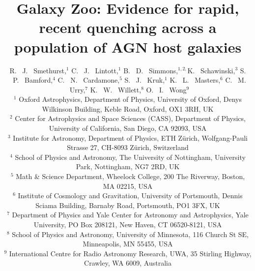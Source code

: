 \documentclass[useAMS,usenatbib]{mn2e}
\begin{document}
\title[Quenching Histories of AGN Host Galaxies]{Galaxy Zoo: Evidence for rapid, recent quenching across a population of AGN host galaxies}
\author[Smethurst et al. 2015]{R. ~J. ~Smethurst,$^{1}$ C. ~J. ~Lintott,$^{1}$ B. ~D. ~Simmons,$^{1, 2,}$\footnotemark[1] K. ~Schawinski,$^{3}$ \newauthor S. ~P. ~Bamford,$^{4}$  C. ~N. ~Cardamone,$^{5}$ S. ~J. ~Kruk,$^{1}$ K. ~L. ~Masters,$^{6}$ \newauthor C. ~M. ~Urry,$^{7}$  K. ~W. ~Willett,$^{8}$ O. ~I. ~Wong$^{9}$ \footnotemark[2]
\\ $^1$ Oxford Astrophysics, Department of Physics, University of Oxford, Denys Wilkinson Building, Keble Road, Oxford, OX1 3RH, UK 
\\ $^{2}$ Center for Astrophysics and Space Sciences (CASS), Department of Physics, University of California, San Diego, CA 92093, USA
\\ $^3$ Institute for Astronomy, Department of Physics, ETH Z\"urich, Wolfgang-Pauli Strasse 27, CH-8093 Z\"urich, Switzerland
\\ $^4$ School of Physics and Astronomy, The University of Nottingham, University Park, Nottingham, NG7 2RD, UK
\\ $^5$ Math \& Science Department, Wheelock College, 200 The Riverway, Boston, MA 02215, USA
\\ $^6$ Institute of Cosmology and Gravitation, University of Portsmouth, Dennis Sciama Building, Barnaby Road, Portsmouth, PO1 3FX, UK 
\\ $^7$ Department of Physics and Yale Center for Astronomy and Astrophysics, Yale University, PO Box 208121, New Haven, CT 06520-8121, USA
\\ $^8$ School of Physics and Astronomy, University of Minnesota, 116 Church St SE, Minneapolis, MN 55455, USA
\\ $^9$ International Centre for Radio Astronomy Research, UWA, 35 Stirling Highway, Crawley, WA 6009, Australia
}

\maketitle
\end{document}
